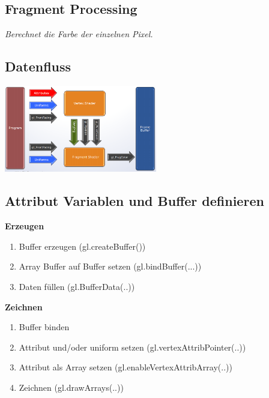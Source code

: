 \subsection{Fragment Processing}

\textit{
    Berechnet die Farbe der einzelnen Pixel.
}

\subsection{Datenfluss}

\includegraphics[width=0.5\textwidth]{assets/dataprocessing.png}

\subsection{Attribut Variablen und Buffer definieren}

\textbf{Erzeugen}

\begin{enumerate}
    \item Buffer erzeugen (gl.createBuffer())
    \item Array Buffer auf Buffer setzen (gl.bindBuffer(...))
    \item Daten füllen (gl.BufferData(..))
\end{enumerate}

\textbf{Zeichnen}

\begin{enumerate}
    \item Buffer binden
    \item Attribut und/oder uniform setzen (gl.vertexAttribPointer(..))
    \item Attribut als Array setzen (gl.enableVertexAttribArray(..))
    \item Zeichnen (gl.drawArrays(..))
\end{enumerate}
